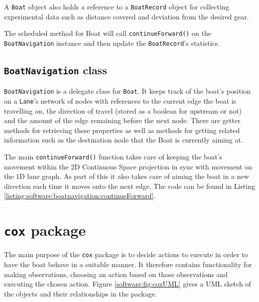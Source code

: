 A \texttt{Boat} object also holds a reference to a \texttt{BoatRecord}
object for collecting experimental data such as distance covered and deviation from the desired gear.

The scheduled method for Boat will call \texttt{continueForward()} on the
\texttt{BoatNavigation} instance and then update the \texttt{BoatRecord}'s statistics.

\subsection{\texttt{BoatNavigation} class}

\texttt{BoatNavigation} is a delegate class for \texttt{Boat}. It keeps track of the
boat's position on a \texttt{Lane}'s network of nodes with references to the
current edge the boat is travelling on, the direction of travel
(stored as a boolean for upstream or not) and the amount of the edge
remaining before the next node. There are getter methods for
retrieving these properties as well as methods for getting related
information such as the destination node that the Boat is currently
aiming at.

The main \texttt{continueForward()} function takes care of keeping the
boat's movement within the 2D Continuous Space projection in sync with
movement on the 1D lane graph. As part of this it also takes care of
aiming the boat in a new direction each time it moves onto the next
edge. The code can be found in Listing \ref{listing:software:boatnavigation:continueForward}.



\section{\texttt{cox} package}

The main purpose of the \texttt{cox} package is to decide actions to execute in order to have the boat behave in a suitable manner. It therefore contains functionality for making observations, choosing an action based on those observations and executing the chosen action. Figure \ref{software:fig:coxUML} gives a UML sketch of the objects and their relationships in the package.

